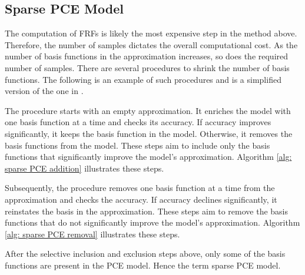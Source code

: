 %
%

\subsection{Sparse PCE Model}
\label{ssec: sparse PCE}

The computation of FRFs is likely the most expensive step in the method above.
Therefore, the number of samples dictates the overall computational cost.
As the number of basis functions in the approximation increases, so does the required number of samples.
There are several procedures to shrink the number of basis functions.
The following is an example of such procedures and is a simplified version of the one in \cite{blatman2010adaptive}.

The procedure starts with an empty approximation.
It enriches the model with one basis function at a time and checks its accuracy.
If accuracy improves significantly, it keeps the basis function in the model.
Otherwise, it removes the basis functions from the model.
These steps aim to include only the basis functions that significantly improve the model's approximation.
Algorithm \ref{alg: sparse PCE addition} illustrates these steps.



Subsequently, the procedure removes one basis function at a time from the approximation and checks the accuracy.
If accuracy declines significantly, it reinstates the basis in the approximation.
These steps aim to remove the basis functions that do not significantly improve the model's approximation.
Algorithm \ref{alg: sparse PCE removal} illustrates these steps.



After the selective inclusion and exclusion steps above, only some of the basis functions are present in the PCE model.
Hence the term sparse PCE model.
